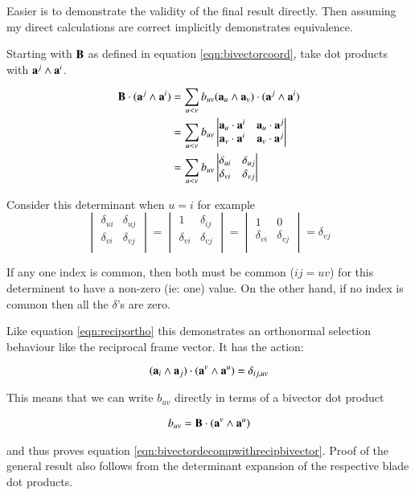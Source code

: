 \documentclass{article}      %
\begin{document}
Easier is to demonstrate the validity of the final result directly.  Then assuming my direct calculations
are correct implicitly demonstrates equivalence.

Starting with $\mathbf{B}$ as defined in equation \ref{eqn:bivectorcoord}, take dot products with 
$\mathbf{a}^j \wedge \mathbf{a}^i$.

\begin{align*}
\mathbf{B} \cdot (\mathbf{a}^j \wedge \mathbf{a}^i)
 &= \sum_{u<v} b_{uv} (\mathbf{a}_u \wedge \mathbf{a}_v) \cdot (\mathbf{a}^j \wedge \mathbf{a}^i) \\
 &= \sum_{u<v} b_{uv} 
\begin{vmatrix}
\mathbf{a}_u \cdot \mathbf{a}^i & \mathbf{a}_u \cdot \mathbf{a}^j \\
\mathbf{a}_v \cdot \mathbf{a}^i & \mathbf{a}_v \cdot \mathbf{a}^j \\
\end{vmatrix} \\
 &= \sum_{u<v} b_{uv} 
\begin{vmatrix}
\delta_{ui} & \delta_{uj} \\
\delta_{vi} & \delta_{vj} \\
\end{vmatrix} \\
\end{align*}

Consider this determinant when $u=i$ for example
\[
\begin{vmatrix}
\delta_{ui} & \delta_{uj} \\
\delta_{vi} & \delta_{vj} \\
\end{vmatrix} 
=
\begin{vmatrix}
1 & \delta_{ij} \\
\delta_{vi} & \delta_{vj} \\
\end{vmatrix}
=
\begin{vmatrix}
1 & 0 \\
\delta_{vi} & \delta_{vj} \\
\end{vmatrix}
= \delta_{vj}
\]

If any one index is common, then both must be common ($ij=uv$) for this determinent to have a non-zero (ie: one) value.  On the other hand, if no index is common then all the $\delta$'s are zero.

Like 
equation \ref{eqn:reciportho}
this demonstrates an orthonormal selection behaviour like the reciprocal frame vector.  It has the action:

\begin{equation}
(\mathbf{a}_i \wedge \mathbf{a}_j) \cdot (\mathbf{a}^v \wedge \mathbf{a}^u) = \delta_{ij,uv}
\end{equation}

This means that we can write $b_{uv}$ directly in terms of a bivector dot product

\begin{align*}
b_{uv} = \mathbf{B} \cdot (\mathbf{a}^v \wedge \mathbf{a}^u)
\end{align*}

and thus proves equation \ref{eqn:bivectordecompwithrecipbivector}.  Proof of the general result
also follows from the determinant expansion of the respective blade dot products.
\end{document}
